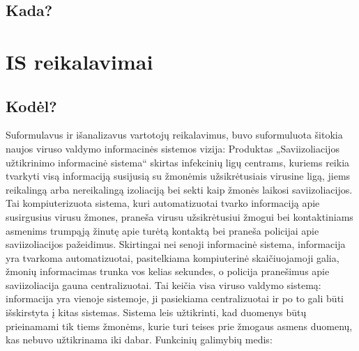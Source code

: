 \documentclass{VUMIFPSkursinis}
\begin{document}
\subsection{Kada?}

\section{IS reikalavimai}

\subsection{Kodėl?}
Suformulavus ir išanalizavus vartotojų reikalavimus, buvo suformuluota šitokia naujos viruso valdymo informacinės sistemos vizija:
Produktas „Saviizoliacijos užtikrinimo informacinė sistema“ skirtas infekcinių ligų centrams, kuriems reikia tvarkyti visą informaciją susijusią su 
žmonėmis užsikrėtusiais virusine ligą, jiems reikalingą arba nereikalingą izoliaciją bei sekti kaip žmonės laikosi saviizoliacijos.
Tai kompiuterizuota sistema, kuri automatizuotai tvarko informaciją apie susirgusius virusu žmones, praneša virusu užsikrėtusiui žmogui bei kontaktiniams asmenims 
trumpąją žinutę apie turėtą kontaktą bei praneša policijai apie saviizoliacijos pažeidimus. Skirtingai nei senoji informacinė sistema, informacija yra tvarkoma
automatizuotai, pasitelkiama kompiuterinė skaičiuojamoji galia, žmonių informacimas trunka vos kelias sekundes, o policija pranešimus apie saviizoliacija gauna centralizuotai.
Tai keičia visa viruso valdymo sistemą: informacija yra vienoje sistemoje, ji pasiekiama centralizuotai ir po to gali būti išskirstyta į kitas sistemas.
Sistema leis užtikrinti, kad duomenys būtų prieinamami tik tiems žmonėms, kurie turi teises prie žmogaus asmens duomenų, kas nebuvo užtikrinama iki dabar.
\medskip
Funkcinių galimybių medis:
\end{document}
